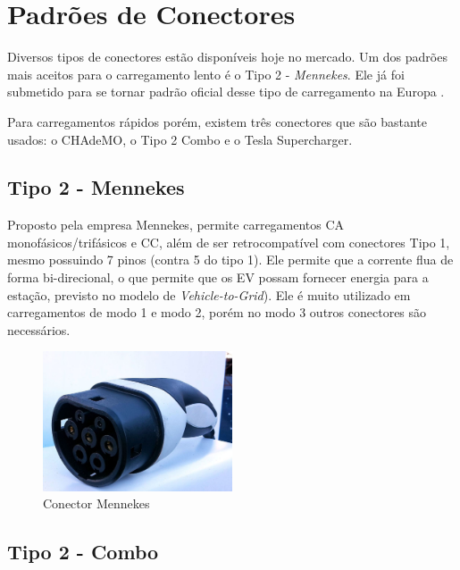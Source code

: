   \section{Padrões de Conectores}

      Diversos tipos de conectores estão disponíveis hoje no mercado. Um dos padrões mais aceitos para o carregamento lento é o Tipo 2 - \textit{Mennekes}. Ele já foi submetido para se tornar padrão oficial desse tipo de carregamento na Europa \cite{mckinsey-report-ev}.

      Para carregamentos rápidos porém, existem três conectores que são bastante usados: o CHAdeMO, o Tipo 2 Combo e o Tesla Supercharger.

      \subsection{Tipo 2 - Mennekes}

        Proposto pela empresa Mennekes, permite carregamentos \ac{CA} monofásicos/trifásicos e \ac{CC}, além de ser retrocompatível com conectores Tipo 1, mesmo possuindo 7 pinos (contra 5 do tipo 1). Ele permite que a corrente flua de forma bi-direcional, o que permite que os \ac{EV} possam fornecer energia para a estação, previsto no modelo de \textit{Vehicle-to-Grid}). Ele é muito utilizado em carregamentos de modo 1 e modo 2, porém no modo 3 outros conectores são necessários.

        \begin{figure}[H]
          \begin{center}
            \includegraphics[width=0.50\textwidth,natwidth=1024,natheight=755]{assets/images/connectors-mennekes.jpg}
            \caption{Conector Mennekes}
            \label{fig:mennekes}
          \end{center}
        \end{figure}

      \subsection{Tipo 2 - Combo}

